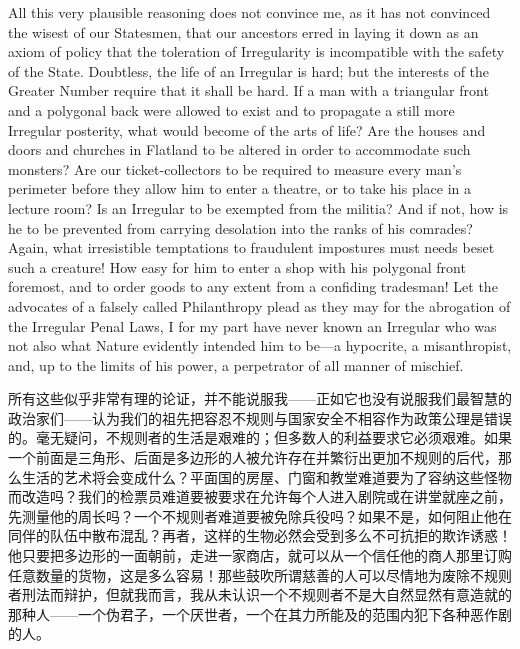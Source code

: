 \documentclass[12pt,UTF8]{ctexbook}
\begin{document}
All this very plausible reasoning does not convince me, as it has not convinced the wisest of our Statesmen, that our ancestors erred in laying it down as an axiom of policy that the toleration of Irregularity is incompatible with the safety of the State. Doubtless, the life of an Irregular is hard; but the interests of the Greater Number require that it shall be hard. If a man with a triangular front and a polygonal back were allowed to exist and to propagate a still more Irregular posterity, what would become of the arts of life? Are the houses and doors and churches in Flatland to be altered in order to accommodate such monsters? Are our ticket-collectors to be required to measure every man's perimeter before they allow him to enter a theatre, or to take his place in a lecture room? Is an Irregular to be exempted from the militia? And if not, how is he to be prevented from carrying desolation into the ranks of his comrades? Again, what irresistible temptations to fraudulent impostures must needs beset such a creature! How easy for him to enter a shop with his polygonal front foremost, and to order goods to any extent from a confiding tradesman! Let the advocates of a falsely called Philanthropy plead as they may for the abrogation of the Irregular Penal Laws, I for my part have never known an Irregular who was not also what Nature evidently intended him to be---a hypocrite, a misanthropist, and, up to the limits of his power, a perpetrator of all manner of mischief.

所有这些似乎非常有理的论证，并不能说服我——正如它也没有说服我们最智慧的政治家们——认为我们的祖先把容忍不规则与国家安全不相容作为政策公理是错误的。毫无疑问，不规则者的生活是艰难的；但多数人的利益要求它必须艰难。如果一个前面是三角形、后面是多边形的人被允许存在并繁衍出更加不规则的后代，那么生活的艺术将会变成什么？平面国的房屋、门窗和教堂难道要为了容纳这些怪物而改造吗？我们的检票员难道要被要求在允许每个人进入剧院或在讲堂就座之前，先测量他的周长吗？一个不规则者难道要被免除兵役吗？如果不是，如何阻止他在同伴的队伍中散布混乱？再者，这样的生物必然会受到多么不可抗拒的欺诈诱惑！他只要把多边形的一面朝前，走进一家商店，就可以从一个信任他的商人那里订购任意数量的货物，这是多么容易！那些鼓吹所谓慈善的人可以尽情地为废除不规则者刑法而辩护，但就我而言，我从未认识一个不规则者不是大自然显然有意造就的那种人——一个伪君子，一个厌世者，一个在其力所能及的范围内犯下各种恶作剧的人。
\end{document}
